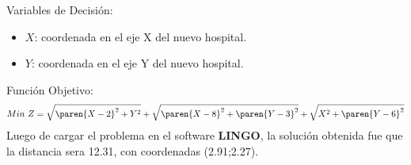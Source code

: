 \begin{homeworkProblem}
Variables de Decisión:
\begin{itemize}
    \item $X$: coordenada en el eje X del nuevo hospital.
    \item $Y$: coordenada en el eje Y del nuevo hospital.
\end{itemize}
Función Objetivo:
\begin{align*}
    Min\ Z = \sqrt{\paren{X-2}^2+Y^2} + \sqrt{\paren{X-8}^2+\paren{Y-3}^2} + \sqrt{X^2+\paren{Y-6}^2}
\end{align*}
Luego de cargar el problema en el software \textbf{LINGO}, la solución obtenida fue que la distancia sera 12.31, con coordenadas (2.91;2.27).
 
\end{homeworkProblem}